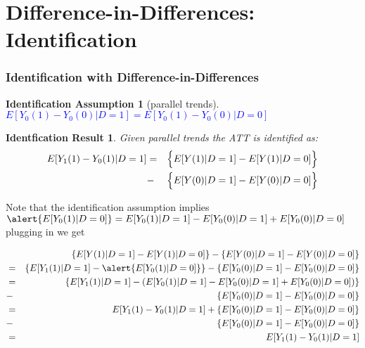 \documentclass{beamer}
\numberwithin{equation}{section}
\newtheorem{iass}{Identification Assumption}
\newtheorem{ires}{Identfication Result}
\begin{document}
\section{Difference-in-Differences: Identification}


\begin{frame}
  \frametitle{Identification with Difference-in-Differences}
\begin{iass}[parallel trends]
\textcolor{blue}{$E[Y_0(1)-Y_0(0)|D=1]=E[Y_0(1)-Y_0(0)|D=0]$}
\end{iass}
\begin{overprint}
\begin{ires}
Given parallel trends the ATT is identified as:\\
\begin{eqnarray*}
E[Y_1(1)-Y_0(1)|D=1]&=&\Bigl\{ E[Y(1)|D=1]-E[Y(1)|D=0] \Bigr\}\\
      &-&\Bigl\{ E[Y(0)|D=1]-E[Y(0)|D=0] \Bigr\}
\end{eqnarray*}
\end{ires}
\scriptsize
\begin{Proof}
Note that the identification assumption implies 
$\alert{E[Y_0(1)|D=0]} = E[Y_0(1)|D=1] - E[Y_0(0)|D=1] + E[Y_0(0)|D=0]$\\
plugging in we get

\begin{eqnarray*}
   & & \left\{ E[Y(1)|D=1]-E[Y(1)|D=0] \right\}
      -\left\{ E[Y(0)|D=1]-E[Y(0)|D=0] \right\}\\
   &=&  \left\{ E[Y_1(1)|D=1]-\alert{E[Y_0(1)|D=0]} \right\}
      -\left\{ E[Y_0(0)|D=1]-E[Y_0(0)|D=0] \right\} \\    
&=& \left\{ E[Y_1(1)|D=1]- \left( E[Y_0(1)|D=1] - E[Y_0(0)|D=1] + E[Y_0(0)|D=0] \right) \right\} \\
&-& \left\{ E[Y_0(0)|D=1]-E[Y_0(0)|D=0] \right\}\\
&= & E[Y_1(1)- Y_0(1)|D=1] + \left\{ E[Y_0(0)|D=1] - E[Y_0(0)|D=0] \right\} \\
      &-&\left\{ E[Y_0(0)|D=1]-E[Y_0(0)|D=0] \right\} \\
 &=&E[Y_1(1)-Y_0(1)|D=1]
\end{eqnarray*}
\end{Proof}
\end{overprint}
\end{frame}
\end{document}
